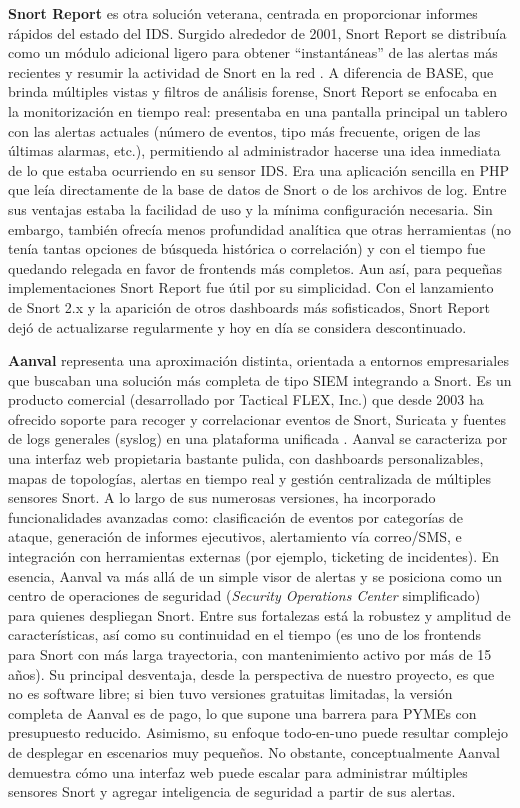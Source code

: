 \documentclass[11pt,a4paper,twoside]{report}
\begin{document}
\textbf{Snort Report} es otra solución veterana, centrada en proporcionar informes rápidos del estado del IDS. Surgido alrededor de 2001, Snort Report se distribuía como un módulo adicional ligero para obtener “instantáneas” de las alertas más recientes y resumir la actividad de Snort en la red \cite{SnortReport2010}. A diferencia de BASE, que brinda múltiples vistas y filtros de análisis forense, Snort Report se enfocaba en la monitorización en tiempo real: presentaba en una pantalla principal un tablero con las alertas actuales (número de eventos, tipo más frecuente, origen de las últimas alarmas, etc.), permitiendo al administrador hacerse una idea inmediata de lo que estaba ocurriendo en su sensor IDS. Era una aplicación sencilla en PHP que leía directamente de la base de datos de Snort o de los archivos de log. Entre sus ventajas estaba la facilidad de uso y la mínima configuración necesaria. Sin embargo, también ofrecía menos profundidad analítica que otras herramientas (no tenía tantas opciones de búsqueda histórica o correlación) y con el tiempo fue quedando relegada en favor de frontends más completos. Aun así, para pequeñas implementaciones Snort Report fue útil por su simplicidad. Con el lanzamiento de Snort 2.x y la aparición de otros dashboards más sofisticados, Snort Report dejó de actualizarse regularmente y hoy en día se considera descontinuado.\newline

\textbf{Aanval} representa una aproximación distinta, orientada a entornos empresariales que buscaban una solución más completa de tipo SIEM integrando a Snort. Es un producto comercial (desarrollado por Tactical FLEX, Inc.) que desde 2003 ha ofrecido soporte para recoger y correlacionar eventos de Snort, Suricata y fuentes de logs generales (syslog) en una plataforma unificada \cite{AanvalWiki}. Aanval se caracteriza por una interfaz web propietaria bastante pulida, con dashboards personalizables, mapas de topologías, alertas en tiempo real y gestión centralizada de múltiples sensores Snort. A lo largo de sus numerosas versiones, ha incorporado funcionalidades avanzadas como: clasificación de eventos por categorías de ataque, generación de informes ejecutivos, alertamiento vía correo/SMS, e integración con herramientas externas (por ejemplo, ticketing de incidentes). En esencia, Aanval va más allá de un simple visor de alertas y se posiciona como un centro de operaciones de seguridad (\textit{Security Operations Center} simplificado) para quienes despliegan Snort. Entre sus fortalezas está la robustez y amplitud de características, así como su continuidad en el tiempo (es uno de los frontends para Snort con más larga trayectoria, con mantenimiento activo por más de 15 años). Su principal desventaja, desde la perspectiva de nuestro proyecto, es que no es software libre; si bien tuvo versiones gratuitas limitadas, la versión completa de Aanval es de pago, lo que supone una barrera para PYMEs con presupuesto reducido. Asimismo, su enfoque todo-en-uno puede resultar complejo de desplegar en escenarios muy pequeños. No obstante, conceptualmente Aanval demuestra cómo una interfaz web puede escalar para administrar múltiples sensores Snort y agregar inteligencia de seguridad a partir de sus alertas.\newline
\end{document}
